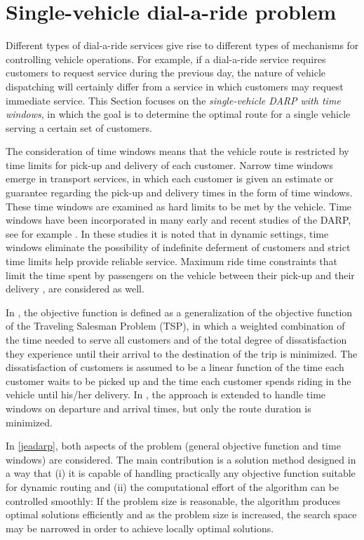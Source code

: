 \documentclass[dissertation,draft*]{aaltoseries}
\begin{document}
\section{Single-vehicle dial-a-ride problem}
\label{singlevehicle}
Different types of dial-a-ride services give rise to
different types of mechanisms for controlling vehicle operations. 
For example, if a dial-a-ride service requires customers to request 
service during the previous day, the nature of vehicle
dispatching will certainly differ from a service in which
customers may request immediate service.
This Section focuses on %
the \emph{single-vehicle DARP with time windows}, in which the goal is to determine the optimal
route for a single vehicle serving a certain set of customers.

The consideration of time windows means that the vehicle route is 
restricted by time limits for pick-up and delivery of each customer.
Narrow time windows emerge in transport services, in which each customer
is given an estimate or guarantee regarding the pick-up and delivery times in the 
form of time windows. These time windows are examined as hard limits to be met by the vehicle.
Time windows have been incorporated in many early and recent studies of the DARP, see for example 
\cite{psaraftis02, jaw, madsen, toth02,cordeau02,diana, wong, cordeau01, berbegliafeas}.
In these studies it is noted that in dynamic settings, time windows eliminate the possibility of indefinite
deferment of customers and strict time limits help provide reliable service.
Maximum ride time constraints that limit the time spent by passengers on the vehicle
between their pick-up and their delivery \cite{hunsaker}, 
are considered as well.

In \cite{psaraftis01}, the objective function is defined as a
generalization of the objective function of the Traveling Salesman Problem (TSP), 
in which a weighted combination
of the time needed to serve all customers and of the total degree of dissatisfaction
they experience until their arrival to the destination of the trip is minimized. The dissatisfaction of
customers is assumed to be a linear function of the time each customer waits to be picked up and the 
time each customer spends riding in the vehicle until his/her delivery.
In \cite{psaraftis02}, the approach is extended to handle time windows on departure and arrival times,
but only the route duration is minimized. 

In \ref{jeadarp}, both aspects of the problem (general objective function and time windows)
are considered. The main contribution is a solution method designed in a way that (i) it is capable of
handling practically any objective function suitable for dynamic routing and (ii) the computational
effort of the algorithm can be controlled smoothly: If the problem size is reasonable, 
the algorithm produces optimal solutions efficiently and as the problem size is increased,
the search space may be narrowed in order to achieve locally optimal solutions.
\end{document}
